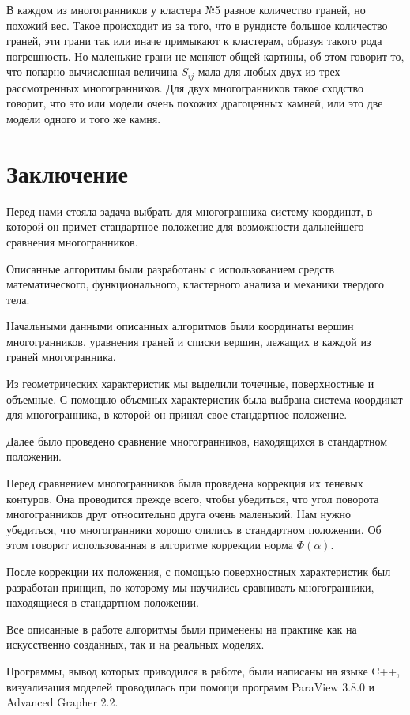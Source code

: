 \documentclass[a4paper,12pt, titlepage]{article}
\begin{document}
В каждом из многогранников у кластера №5 разное количество граней, но похожий вес. Такое происходит 
из за того, что в рундисте большое количество граней, эти грани так или иначе примыкают  к кластерам, образуя 
такого рода погрешность. Но маленькие грани не меняют общей картины, об этом говорит то, что 
попарно вычисленная величина $S_{ij}$ мала для любых двух из  трех рассмотренных многогранников.  
Для двух многогранников такое сходство говорит, что это или модели очень похожих драгоценных камней, или это
две модели одного и того же камня.  
\newpage
\section{Заключение}
Перед нами стояла задача выбрать для многогранника систему координат,  в которой он примет стандартное положение для 
возможности дальнейшего сравнения многогранников.

Описанные алгоритмы были разработаны  с использованием средств математического, функционального, 
кластерного анализа и механики твердого тела. 
 
Начальными данными описанных алгоритмов были координаты вершин многогранников, уравнения граней и списки вершин, 
лежащих в каждой из граней многогранника.

Из геометрических характеристик мы выделили точечные, поверхностные и объемные. С помощью объемных характеристик 
была выбрана система координат для многогранника, в которой он принял свое стандартное положение.

Далее было проведено сравнение многогранников, находящихся в стандартном положении.

Перед сравнением многогранников была проведена коррекция их теневых контуров.  
Она проводится прежде всего, чтобы убедиться, что угол поворота многогранников друг относительно друга очень маленький.
Нам нужно убедиться, что многогранники хорошо слились в стандартном положении. Об этом говорит использованная в алгоритме
коррекции норма $\Phi(\alpha)$.

После коррекции их положения, с помощью поверхностных характеристик был разработан принцип, по которому 
мы научились сравнивать многогранники, находящиеся в стандартном положении.

Все описанные в работе алгоритмы были применены на практике как на искусственно созданных, 
так и на реальных моделях. 

Программы, вывод которых приводился в работе, были написаны на языке C++, визуализация моделей
проводилась при помощи программ ParaView 3.8.0  и Advanced Grapher 2.2. 
\end{document}
